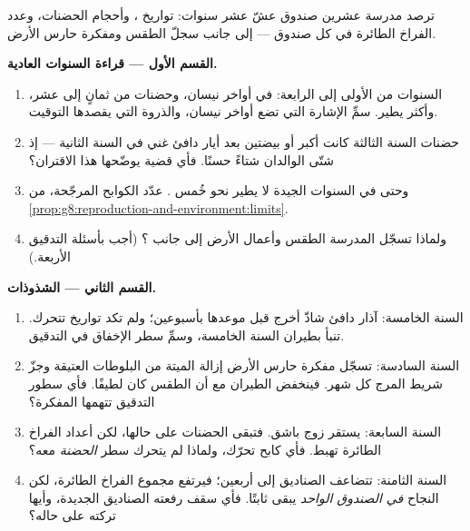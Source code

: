 \begin{problem}\label{pb:g8:reproduction-and-environment:1}
ترصد مدرسة عشرين صندوق عشّ عشر سنوات: تواريخ ، وأحجام
الحضنات، وعدد الفراخ الطائرة في كل صندوق --- إلى جانب سجلّ الطقس
ومفكرة حارس الأرض.

\medskip\noindent\textbf{القسم الأول --- قراءة السنوات
العادية.}
\begin{enumerate}
  \item السنوات من الأولى إلى الرابعة:  في أواخر نيسان،
        وحضنات من ثمانٍ إلى عشر، وأكثر  يطير. سمِّ الإشارة
        التي تضع أواخر نيسان، والذروة التي يقصدها التوقيت.
  \item حضنات السنة الثالثة كانت أكبر  أو بيضتين بعد أيار
        دافئ غني  في السنة الثانية --- إذ شتّى الوالدان
        شتاءً حسنًا. فأي قضية يوضّحها هذا الاقتران؟
  \item وحتى في السنوات الجيدة لا يطير نحو خُمس . عدّد
        الكوابح المرجّحة، من
        \cref{prop:g8:reproduction-and-environment:limits}.
  \item ولماذا تسجّل المدرسة الطقس وأعمال الأرض إلى جانب ؟
        (أجب بأسئلة التدقيق الأربعة.)
\end{enumerate}

\medskip\noindent\textbf{القسم الثاني --- الشذوذات.}
\begin{enumerate}[resume]
  \item السنة الخامسة: آذار دافئ شاذّ أخرج  قبل موعدها
        بأسبوعين؛ ولم تكد تواريخ  تتحرك. تنبأ بطيران السنة
        الخامسة، وسمِّ سطر الإخفاق في التدقيق.
  \item السنة السادسة: تسجّل مفكرة حارس الأرض إزالة 
        الميتة من البلوطات العتيقة وجزّ شريط المرج كل شهر.
        فينخفض الطيران مع أن الطقس كان لطيفًا. فأي سطور التدقيق
        تتهمها المفكرة؟
  \item السنة السابعة: يستقر زوج باشق. فتبقى الحضنات على حالها،
        لكن أعداد الفراخ الطائرة تهبط. فأي كابح تحرّك، ولماذا لم
        يتحرك سطر \emph{الحضنة} معه؟
  \item السنة الثامنة: تتضاعف الصناديق إلى أربعين؛ فيرتفع مجموع
        الفراخ الطائرة، لكن النجاح \emph{في الصندوق الواحد} يبقى
        ثابتًا. فأي سقف رفعته الصناديق الجديدة، وأيها تركته على
        حاله؟
\end{enumerate}


\end{problem}
